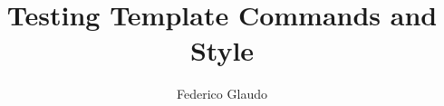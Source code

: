 \documentclass[a4paper,12pt]{article}
\title{Testing Template Commands and Style}
\author{Federico Glaudo}
\begin{document}
	\maketitle
	\tableofcontents
	\Blinddocument
\end{document}
